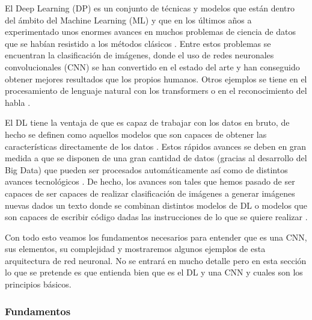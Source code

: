 \documentclass[a4paper,12pt,twoside,titlepage]{article}
\begin{document}
El Deep Learning (DP) es un conjunto de técnicas y modelos que están dentro del ámbito del Machine Learning (ML) y que en los últimos años a experimentado unos enormes avances en muchos problemas de ciencia de datos que se habían resistido a los métodos clásicos \cite{dl_nature}. Entre estos problemas se encuentran la clasificación de imágenes, donde el uso de redes neuronales convolucionales (CNN) se han convertido en el estado del arte y han conseguido obtener mejores resultados que los propios humanos. Otros ejemplos se tiene en el procesamiento de lenguaje natural con los transformers o en el reconocimiento del habla \cite{korean_dl}.

El DL tiene la ventaja de que es capaz de trabajar con los datos en bruto, de hecho se definen como aquellos modelos que son capaces de obtener las características directamente de los datos \cite{dl_book}. Estos rápidos avances se deben en gran medida a que se disponen de una gran cantidad de datos (gracias al desarrollo del Big Data) que pueden ser procesados automáticamente así como de distintos avances tecnológicos \cite{korean_dl,dl_nature}. De hecho, los avances son tales que hemos pasado de ser capaces de ser capaces de realizar clasificación de imágenes a generar imágenes nuevas dados un texto donde se combinan distintos modelos de DL \cite{hier} o modelos que son capaces de escribir código dadas las instrucciones de lo que se quiere realizar \cite{codex}.

Con todo esto veamos los fundamentos necesarios para entender que es una CNN, sus elementos, su complejidad y mostraremos algunos ejemplos de esta arquitectura de red neuronal. No se entrará en mucho detalle pero en esta sección lo que se pretende es que entienda bien que es el DL y una CNN y cuales son los principios básicos. 

\subsubsection*{Fundamentos}
\end{document}
